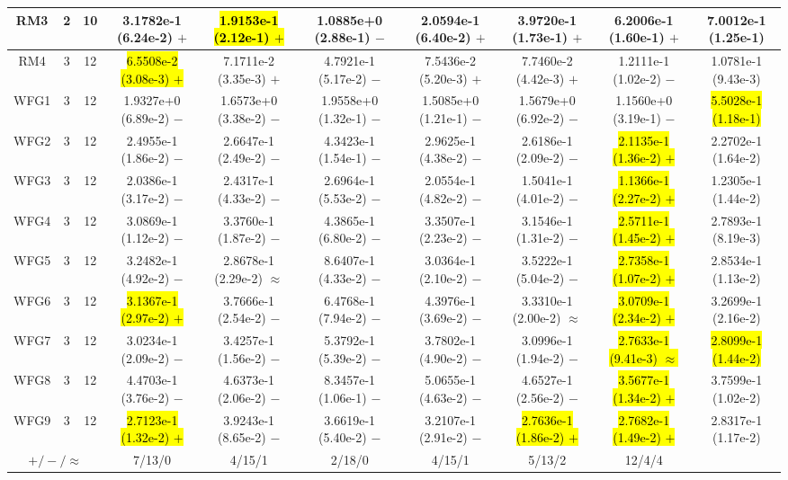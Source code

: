 \documentclass[journal]{IEEEtran}
\begin{document}
\begin{table*}[htbp]
\begin{tabular}{cccccccccc}
\multirow{1}{*}{RM3}&2&10&3.1782e-1 (6.24e-2) $+$&\hl{1.9153e-1 (2.12e-1) $+$}&1.0885e+0 (2.88e-1) $-$&2.0594e-1 (6.40e-2) $+$&3.9720e-1 (1.73e-1) $+$&6.2006e-1 (1.60e-1) $+$&7.0012e-1 (1.25e-1)\\
\hline
\multirow{1}{*}{RM4}&3&12&\hl{6.5508e-2 (3.08e-3) $+$}&7.1711e-2 (3.35e-3) $+$&4.7921e-1 (5.17e-2) $-$&7.5436e-2 (5.20e-3) $+$&7.7460e-2 (4.42e-3) $+$&1.2111e-1 (1.02e-2) $-$&1.0781e-1 (9.43e-3)\\
\hline
\multirow{1}{*}{WFG1}&3&12&1.9327e+0 (6.89e-2) $-$&1.6573e+0 (3.38e-2) $-$&1.9558e+0 (1.32e-1) $-$&1.5085e+0 (1.21e-1) $-$&1.5679e+0 (6.92e-2) $-$&1.1560e+0 (3.19e-1) $-$&\hl{5.5028e-1 (1.18e-1)}\\
\hline
\multirow{1}{*}{WFG2}&3&12&2.4955e-1 (1.86e-2) $-$&2.6647e-1 (2.49e-2) $-$&4.3423e-1 (1.54e-1) $-$&2.9625e-1 (4.38e-2) $-$&2.6186e-1 (2.09e-2) $-$&\hl{2.1135e-1 (1.36e-2) $+$}&2.2702e-1 (1.64e-2)\\
\hline
\multirow{1}{*}{WFG3}&3&12&2.0386e-1 (3.17e-2) $-$&2.4317e-1 (4.33e-2) $-$&2.6964e-1 (5.53e-2) $-$&2.0554e-1 (4.82e-2) $-$&1.5041e-1 (4.01e-2) $-$&\hl{1.1366e-1 (2.27e-2) $+$}&1.2305e-1 (1.44e-2)\\
\hline
\multirow{1}{*}{WFG4}&3&12&3.0869e-1 (1.12e-2) $-$&3.3760e-1 (1.87e-2) $-$&4.3865e-1 (6.80e-2) $-$&3.3507e-1 (2.23e-2) $-$&3.1546e-1 (1.31e-2) $-$&\hl{2.5711e-1 (1.45e-2) $+$}&2.7893e-1 (8.19e-3)\\
\hline
\multirow{1}{*}{WFG5}&3&12&3.2482e-1 (4.92e-2) $-$&2.8678e-1 (2.29e-2) $\approx$&8.6407e-1 (4.33e-2) $-$&3.0364e-1 (2.10e-2) $-$&3.5222e-1 (5.04e-2) $-$&\hl{2.7358e-1 (1.07e-2) $+$}&2.8534e-1 (1.13e-2)\\
\hline
\multirow{1}{*}{WFG6}&3&12&\hl{3.1367e-1 (2.97e-2) $+$}&3.7666e-1 (2.54e-2) $-$&6.4768e-1 (7.94e-2) $-$&4.3976e-1 (3.69e-2) $-$&3.3310e-1 (2.00e-2) $\approx$&\hl{3.0709e-1 (2.34e-2) $+$}&3.2699e-1 (2.16e-2)\\
\hline
\multirow{1}{*}{WFG7}&3&12&3.0234e-1 (2.09e-2) $-$&3.4257e-1 (1.56e-2) $-$&5.3792e-1 (5.39e-2) $-$&3.7802e-1 (4.90e-2) $-$&3.0996e-1 (1.94e-2) $-$&\hl{2.7633e-1 (9.41e-3) $\approx$}&\hl{2.8099e-1 (1.44e-2)}\\
\hline
\multirow{1}{*}{WFG8}&3&12&4.4703e-1 (3.76e-2) $-$&4.6373e-1 (2.06e-2) $-$&8.3457e-1 (1.06e-1) $-$&5.0655e-1 (4.63e-2) $-$&4.6527e-1 (2.56e-2) $-$&\hl{3.5677e-1 (1.34e-2) $+$}&3.7599e-1 (1.02e-2)\\
\hline
\multirow{1}{*}{WFG9}&3&12&\hl{2.7123e-1 (1.32e-2) $+$}&3.9243e-1 (8.65e-2) $-$&3.6619e-1 (5.40e-2) $-$&3.2107e-1 (2.91e-2) $-$&\hl{2.7636e-1 (1.86e-2) $+$}&\hl{2.7682e-1 (1.49e-2) $+$}&2.8317e-1 (1.17e-2)\\
\hline
\multicolumn{3}{c}{$+/-/\approx$}&7/13/0&4/15/1&2/18/0&4/15/1&5/13/2&12/4/4&\\
\bottomrule
\end{tabular}
\label{No Label}
\end{table*}
\end{document}
